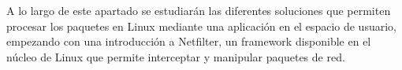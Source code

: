 A lo largo de este apartado se estudiarán las diferentes soluciones que permiten procesar los paquetes en Linux mediante una aplicación en el espacio de usuario, empezando con una introducción a Netfilter, un framework disponible en el núcleo de Linux que permite interceptar y manipular paquetes de red.
